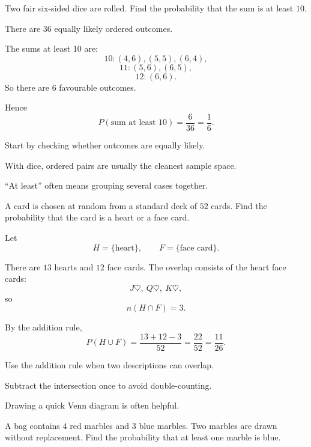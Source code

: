 \begin{problem}
Two fair six-sided dice are rolled. Find the probability that the sum is at least $10$.
\end{problem}

\begin{solution}
There are $36$ equally likely ordered outcomes.

The sums at least $10$ are:
\[
10:(4,6),(5,5),(6,4),
\]
\[
11:(5,6),(6,5),
\]
\[
12:(6,6).
\]
So there are $6$ favourable outcomes.

Hence
\[
P(\text{sum at least }10)=\frac{6}{36}=\frac16.
\]
\end{solution}

\begin{takeaways}
\item Start by checking whether outcomes are equally likely.
\item With dice, ordered pairs are usually the cleanest sample space.
\item ``At least'' often means grouping several cases together.
\end{takeaways}

\begin{problem}
A card is chosen at random from a standard deck of $52$ cards. Find the probability that the card is a heart or a face card.
\end{problem}

\begin{solution}
Let
\[
H=\{\text{heart}\},
\qquad
F=\{\text{face card}\}.
\]

There are $13$ hearts and $12$ face cards. The overlap consists of the heart face cards:
\[
J\heartsuit,\ Q\heartsuit,\ K\heartsuit,
\]
so
\[
n(H\cap F)=3.
\]

By the addition rule,
\[
P(H\cup F)=\frac{13+12-3}{52}=\frac{22}{52}=\frac{11}{26}.
\]
\end{solution}

\begin{takeaways}
\item Use the addition rule when two descriptions can overlap.
\item Subtract the intersection once to avoid double-counting.
\item Drawing a quick Venn diagram is often helpful.
\end{takeaways}

\begin{problem}
A bag contains $4$ red marbles and $3$ blue marbles. Two marbles are drawn without replacement. Find the probability that at least one marble is blue.
\end{problem}

